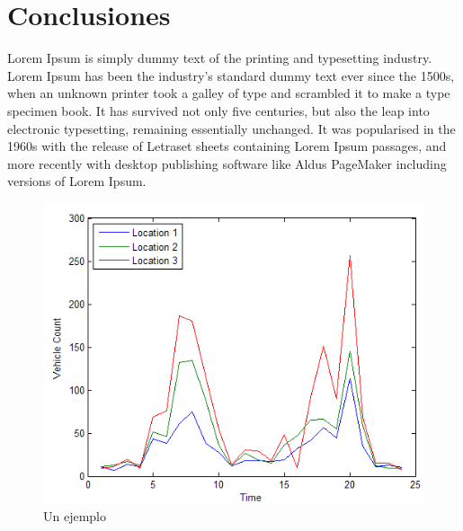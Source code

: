 \documentclass[11pt, spanish]{article}
\begin{document}
\section{Conclusiones}

Lorem Ipsum is simply dummy text of the printing and typesetting industry. Lorem Ipsum has been the industry's standard dummy text ever since the 1500s, when an unknown printer took a galley of type and scrambled it to make a type specimen book. It has survived not only five centuries, but also the leap into electronic typesetting, remaining essentially unchanged. It was popularised in the 1960s with the release of Letraset sheets containing Lorem Ipsum passages, and more recently with desktop publishing software like Aldus PageMaker including versions of Lorem Ipsum.

\begin{figure}[htbp]
\centering
	\includegraphics[scale=0.8]{data/img/plot3}
	\caption{Un ejemplo}
\end{figure}
\end{document}
